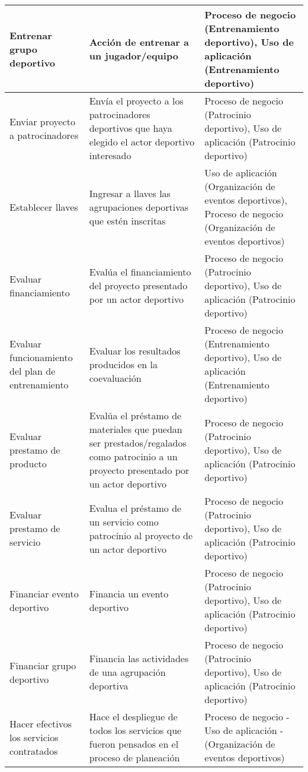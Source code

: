 \begin{center}
\begin{longtable}{|p{4cm}|p{7cm}|p{4cm}|}
		\\
		\hline
		Entrenar grupo deportivo & 
		Acción de entrenar a un jugador/equipo & 
		Proceso de negocio (Entrenamiento deportivo), Uso de aplicación (Entrenamiento deportivo)
		\\
		\hline
		Enviar proyecto a patrocinadores & 
		Envía el proyecto a los patrocinadores deportivos que haya elegido el actor deportivo interesado & 
		Proceso de negocio (Patrocinio deportivo), Uso de aplicación (Patrocinio deportivo)
		\\
		\hline
		Establecer llaves & 
		Ingresar a llaves las agrupaciones deportivas que estén inscritas & 
		Uso de aplicación (Organización de eventos deportivos), Proceso de negocio (Organización de eventos deportivos)
		\\
		\hline
		Evaluar financiamiento & 
		Evalúa el financiamiento del proyecto presentado por un actor deportivo & 
		Proceso de negocio (Patrocinio deportivo), Uso de aplicación (Patrocinio deportivo)
		\\
		\hline
		Evaluar funcionamiento del plan de entrenamiento & 
		Evaluar los resultados producidos en la coevaluación & 
		Proceso de negocio (Entrenamiento deportivo), Uso de aplicación (Entrenamiento deportivo)
		\\
		\hline
		Evaluar prestamo de producto & 
		Evalúa el préstamo de materiales que puedan ser prestados/regalados como patrocinio a un proyecto presentado por un actor deportivo & 
		Proceso de negocio (Patrocinio deportivo), Uso de aplicación (Patrocinio deportivo)
		\\
		\hline
		Evaluar prestamo de servicio & 
		Evalua el préstamo de un servicio como patrocinio al proyecto de un actor deportivo & 
		Proceso de negocio (Patrocinio deportivo), Uso de aplicación (Patrocinio deportivo)
		\\
		\hline
		Financiar evento deportivo & 
		Financia un evento deportivo & 
		Proceso de negocio (Patrocinio deportivo), Uso de aplicación (Patrocinio deportivo)
		\\
		\hline
		Financiar grupo deportivo & 
		Financia las actividades de una agrupación deportiva & 
		Proceso de negocio (Patrocinio deportivo), Uso de aplicación (Patrocinio deportivo)
		\\
		\hline
		Hacer efectivos los servicios contratados & 
		Hace el despliegue de todos los servicios que fueron pensados en el proceso de planeación & 
		Proceso de negocio - Uso de aplicación - (Organización de eventos deportivos)
		\\
		\hline

\end{longtable}
\end{center}

